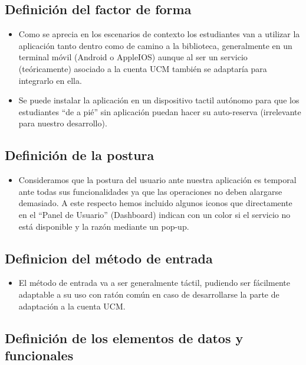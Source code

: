 \documentclass[12pt]{article}
\begin{document}
\subsection{Definición del factor de forma}
\begin{itemize}

\item Como se aprecia en los escenarios de contexto los estudiantes van a utilizar la aplicación tanto dentro como de camino a la biblioteca, generalmente en un terminal móvil (Android o AppleIOS) aunque al ser un servicio (teóricamente) asociado a la cuenta UCM también se adaptaría para integrarlo en ella.

\item Se puede instalar la aplicación en un dispositivo tactil autónomo para que los estudiantes “de a pié” sin aplicación puedan hacer su auto-reserva (irrelevante para nuestro desarrollo).

\end{itemize}
\subsection{Definición de la postura}
\begin{itemize}

\item Consideramos que la postura del usuario ante nuestra aplicación es temporal ante todas sus funcionalidades ya que las operaciones no deben alargarse demasiado. A este respecto hemos incluido algunos iconos que directamente en el “Panel de Usuario” (Dashboard) indican con un color si el servicio no está disponible y la razón mediante un pop-up.

\end{itemize}
\subsection{Definicion del método de entrada}
\begin{itemize}

\item El método de entrada va a ser generalmente táctil, pudiendo ser fácilmente adaptable a su uso con ratón común en caso de desarrollarse la parte de adaptación a la cuenta UCM.
\newpage
\end{itemize}
\subsection{Definición de los elementos de datos y funcionales }
\end{document}
